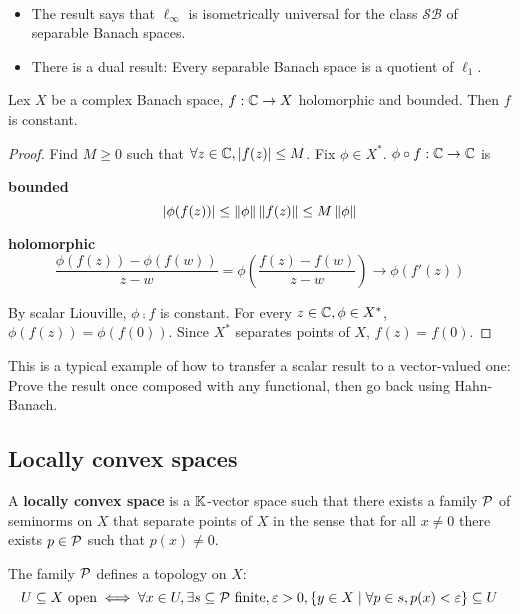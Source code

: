 \documentclass{article}
\begin{document}
\newlec

\begin{rmks}~
  \begin{itemize}
    \item The result says that $\ell_\infty$ is isometrically universal for the class $\mathcal{SB}$ of separable Banach spaces.
    \item There is a dual result: Every separable Banach space is a quotient of $\ell_1$.
  \end{itemize}
\end{rmks}

\begin{thm}\label{thm:vector-liouville}
  Lex $X$ be a complex Banach space, $f : \mathbb C \to X$ holomorphic and bounded. Then $f$ is constant.
\end{thm}
\begin{proof}
  Find $M \ge 0$ such that $\forall z \in \mathbb C, \left\lvert f(z)\right\rvert \le M$. Fix $\phi \in X^*$. $\phi \circ f : \mathbb C \to \mathbb C$ is

  {\bf bounded}
  $$\left\lvert \phi(f(z))\right\rvert \le \left\lVert \phi\right\rVert \left\lVert f(z)\right\rVert \le M\left\lVert \phi\right\rVert$$

  {\bf holomorphic}
  $$\frac{\phi(f(z)) - \phi(f(w))}{z - w} = \phi\left(\frac{f(z) - f(w)}{z - w}\right) \to \phi(f'(z))$$

  By scalar Liouville, $\phi \comp f$ is constant. For every $z \in \mathbb C, \phi \in X^*$, $\phi(f(z)) = \phi(f(0))$. Since $X^*$ separates points of $X$, $f(z) = f(0)$.
\end{proof}

\begin{rmk}
  This is a typical example of how to transfer a scalar result to a vector-valued one: Prove the result once composed with any functional, then go back using Hahn-Banach.
\end{rmk}

\subsection{Locally convex spaces}

\begin{dfn*}
  A {\bf locally convex space} is a $\mathbb K$-vector space such that there exists a family $\mathcal P$ of seminorms on $X$ that separate points of $X$ in the sense that for all $x \ne 0$ there exists $p \in \mathcal P$ such that $p(x) \ne 0$.
\end{dfn*}

The family $\mathcal P$ defines a topology on $X$:
$$U \subseteq X \text{ open} \iff \forall x \in U, \exists s \subseteq \mathcal P \text{ finite}, \varepsilon > 0, \{y \in X \mid \forall p \in s, p(x) < \varepsilon\} \subseteq U$$
\end{document}

